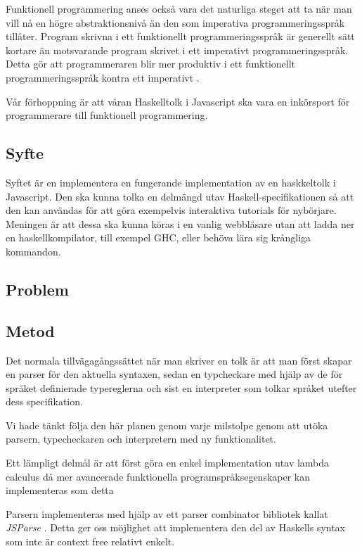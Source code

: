 Funktionell programmering anses också vara det naturliga steget att ta när man vill nå en högre abstraktionsnivå än den som imperativa programmeringsspråk tillåter. Program skrivna i ett funktionellt programmeringsspråk är generellt sätt kortare än motsvarande program skrivet i ett imperativt programmeringsspråk. Detta gör att programmeraren blir mer produktiv i ett funktionellt programmeringsspråk kontra ett imperativt \citep{why}.

Vår förhoppning är att våran Haskelltolk i Javascript ska vara en inkörsport för programmerare till funktionell programmering. %


\subsection{Syfte}
Syftet är en implementera en fungerande implementation av en haskkeltolk i Javascript. Den ska kunna tolka en delmängd utav Haskell-specifikationen så att den kan användas för att göra exempelvis interaktiva tutorials för nybörjare.
Meningen är att dessa ska kunna köras i en vanlig webbläsare utan att ladda ner en haskellkompilator, till exempel GHC, eller behöva lära sig krångliga kommandon.

\subsection{Problem} 

\subsection{Metod} 
Det normala tillvägagångssättet när man skriver en tolk är att man först
skapar en parser för den aktuella syntaxen, sedan en typcheckare med 
hjälp av de för språket definierade typereglerna och sist en interpreter
som tolkar språket utefter dess specifikation.

Vi hade tänkt följa den här planen genom varje milstolpe genom att utöka parsern, typecheckaren och interpretern med ny funktionalitet.

Ett lämpligt delmål är att först göra en enkel implementation utav lambda calculus då mer avancerade funktionella programspråksegenskaper kan implementeras som detta \citep{jones87}

 Parsern implementeras med hjälp av ett parser combinator bibliotek kallat \emph{JSParse} \citep{jsparse}. Detta ger oss möjlighet att implementera den del av Haskells syntax som inte är context free relativt enkelt.


